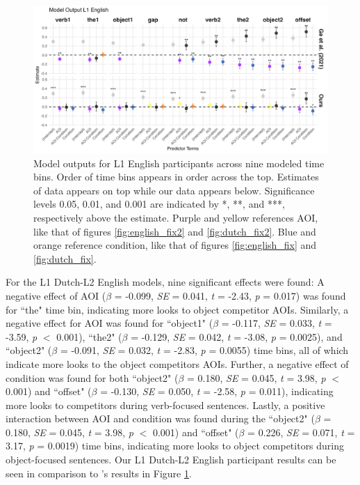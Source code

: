 \begin{figure}[H]  %
    \centering
    \includegraphics[width=\textwidth,height=\textheight,keepaspectratio]{viz/model_plot_english.png}
    \caption{Model outputs for L1 English participants across nine modeled time bins. Order of time bins appears in order across the top. Estimates of \cite{ge2021a} data appears on top while our data appears below. Significance levels 0.05, 0.01, and 0.001 are indicated by *, **, and ***, respectively above the estimate. Purple and yellow references AOI, like that of figures \ref{fig:english_fix2} and \ref{fig:dutch_fix2}. Blue and orange reference condition, like that of figures \ref{fig:english_fix} and \ref{fig:dutch_fix}.}
    \label{fig:model_plot_english}
\end{figure}

For the L1 Dutch-L2 English models, nine significant effects were found: A negative effect of AOI ($\beta$ = -0.099, \textit{SE} = 0.041, \textit{t} = -2.43, \textit{p} = 0.017) was found for ``the" time bin, indicating more looks to object competitor AOIs. Similarly, a negative effect for AOI was found for ``object1" ($\beta$ = -0.117, \textit{SE} = 0.033, \textit{t} = -3.59, \textit{p} $<$ 0.001), ``the2" ($\beta$ = -0.129, \textit{SE} = 0.042, \textit{t} = -3.08, \textit{p} = 0.0025), and ``object2" ($\beta$ = -0.091, \textit{SE} = 0.032, \textit{t} = -2.83, \textit{p} = 0.0055) time bins, all of which indicate more looks to the object competitors AOIs. Further, a negative effect of condition was found for both ``object2" ($\beta$ = 0.180, \textit{SE} = 0.045, \textit{t} = 3.98, \textit{p} $<$ 0.001) and ``offset" ($\beta$ = -0.130, \textit{SE} = 0.050, \textit{t} = -2.58, \textit{p} = 0.011), indicating more looks to competitors during verb-focused sentences. Lastly, a positive interaction between AOI and condition was found during the ``object2" ($\beta$ = 0.180, \textit{SE} = 0.045, \textit{t} = 3.98, \textit{p} $<$ 0.001) and ``offset" ($\beta$ = 0.226, \textit{SE} = 0.071, \textit{t} = 3.17, \textit{p} = 0.0019) time bins, indicating more looks to object competitors during object-focused sentences. Our L1 Dutch-L2 English participant results can be seen in comparison to \cite{ge2021a}'s results in Figure \ref{fig:model_plot_english}.


